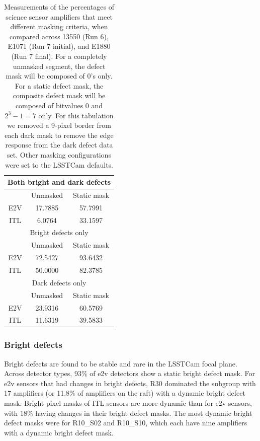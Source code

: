 \begin{table}[ht]
\centering
\begin{tabular}{|ccc|}
\hline
\multicolumn{3}{|c|}{Both bright and dark defects}                      \\ \hline
\multicolumn{1}{|c|}{}    & \multicolumn{1}{c|}{Unmasked} & Static mask \\ \hline
\multicolumn{1}{|c|}{E2V} & \multicolumn{1}{c|}{17.7885}  & 57.7991     \\ \hline
\multicolumn{1}{|c|}{ITL} & \multicolumn{1}{c|}{6.0764}   & 33.1597     \\ \hline
\multicolumn{3}{|c|}{Bright defects only}                               \\ \hline
\multicolumn{1}{|c|}{}    & \multicolumn{1}{c|}{Unmasked} & Static mask \\ \hline
\multicolumn{1}{|c|}{E2V} & \multicolumn{1}{c|}{72.5427}  & 93.6432     \\ \hline
\multicolumn{1}{|c|}{ITL} & \multicolumn{1}{c|}{50.0000}  & 82.3785     \\ \hline
\multicolumn{3}{|c|}{Dark defects only}                                 \\ \hline
\multicolumn{1}{|c|}{}    & \multicolumn{1}{c|}{Unmasked} & Static mask \\ \hline
\multicolumn{1}{|c|}{E2V} & \multicolumn{1}{c|}{23.9316}  & 60.5769     \\ \hline
\multicolumn{1}{|c|}{ITL} & \multicolumn{1}{c|}{11.6319}  & 39.5833     \\ \hline
\end{tabular}
\caption{Measurements of the percentages of science sensor amplifiers that meet different masking criteria, when compared across 13550 (Run 6), E1071 (Run 7 initial), and E1880 (Run 7 final). For a completely unmasked segment, the defect mask will be composed of 0's only. For a static defect mask, the composite defect mask will be composed of bitvalues 0 and $2^3-1=7$ only. For this tabulation we removed a 9-pixel border from each dark mask to remove the edge response from the dark defect data set. Other masking configurations were set to the LSSTCam defaults.}
\label{table:defectStability:measurements}
\end{table}

\subsubsection{Bright defects}

Bright defects are found to be stable and rare in the LSSTCam focal plane. Across detector types, 93\% of e2v detectors show a static bright defect mask. For e2v sensors that had changes in bright defects, R30 dominated the subgroup with 17 amplifiers (or 11.8\% of amplifiers on the raft) with a dynamic bright defect mask. Bright pixel masks of ITL sensors are more dynamic than for e2v sensors, with 18\% having changes in their bright defect masks. The most dynamic bright defect masks were for R10\_S02 and R10\_S10, which each have nine amplifiers with a dynamic bright defect mask.


